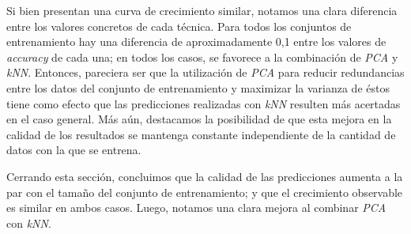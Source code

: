 \par
Si bien presentan una curva de crecimiento similar, notamos una clara diferencia entre los valores concretos de cada técnica. Para todos los conjuntos de entrenamiento hay una diferencia de aproximadamente 0,1 entre los valores de \emph{accuracy} de cada una; en todos los casos, se favorece a la combinación de \emph{PCA} y \emph{kNN}. Entonces, pareciera ser que la utilización de \emph{PCA} para reducir redundancias entre los datos del conjunto de entrenamiento y maximizar la varianza de éstos tiene como efecto que las predicciones realizadas con \emph{kNN} resulten más acertadas en el caso general. Más aún, destacamos la posibilidad de que esta mejora en la calidad de los resultados se mantenga constante independiente de la cantidad de datos con la que se entrena.
\par
Cerrando esta sección, concluimos que la calidad de las predicciones aumenta a la par con el tamaño del conjunto de entrenamiento; y que el crecimiento observable es similar en ambos casos. Luego, notamos una clara mejora al combinar \emph{PCA} con \emph{kNN}.

